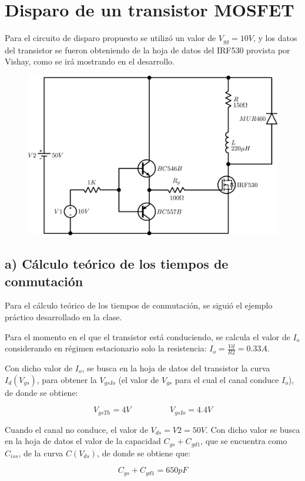\documentclass[e4_tp1_main.tex]{subfiles}
\begin{document}
\section{Disparo de un transistor MOSFET}

Para el circuito de disparo propuesto se utilizó un valor de $V_{gg}=10V$, y los datos del transistor se fueron obteniendo de la hoja de datos del IRF530 provista por Vishay, como se irá mostrando en el desarrollo.

\begin{figure}[H]
\centering
\includegraphics[width=0.6\linewidth]{Imagenes/Punto1/CircuitoDisparo.png}
\end{figure}

\subsection*{a) Cálculo teórico de los tiempos de conmutación}

Para el cálculo teórico de los tiempos de conmutación, se siguió el ejemplo práctico desarrollado en la clase.\par
Para el momento en el que el transistor está conduciendo, se calcula el valor de $I_o$ considerando en régimen estacionario solo la resistencia: $I_o = \frac{Vd}{R2} = 0.33A$.

Con dicho valor de $I_o$, se busca en la hoja de datos del transistor la curva $I_d(V_{gs})$, para obtener la $V_{gsIo}$ (el valor de $V_{gs}$ para el cual el canal conduce $I_o$), de donde se obtiene:

\[
V_{gsTh} = 4V \hspace{2cm} V_{gsIo} = 4.4V
\]

Cuando el canal no conduce, el valor de $V_{ds} = V2 = 50V$. Con dicho valor se busca en la hoja de datos el valor de la capacidad $C_{gs} + C_{gd1}$, que se encuentra como $C_{iss}$, de la curva $C(V_{ds})$, de donde se obtiene que:

\[
C_{gs} + C_{gd1} = 650pF
\]
\end{document}
